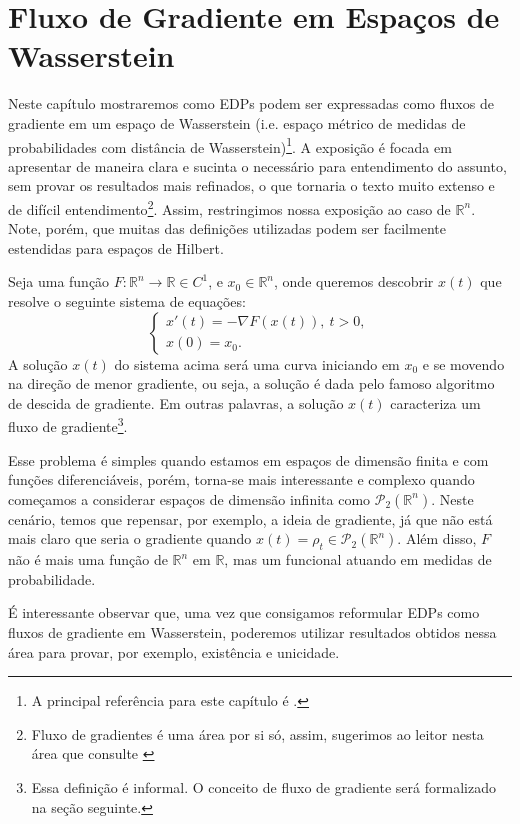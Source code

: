 \newpage
\chapter{Fluxo de Gradiente em Espaços de Wasserstein}

Neste capítulo mostraremos como EDPs podem ser expressadas como
fluxos de gradiente em um espaço de Wasserstein
(i.e. espaço métrico de medidas de probabilidades com distância
de Wasserstein)\footnote{A principal referência para este capítulo
é \citet{santambrogio2017euclidean}.}. A exposição é
focada em apresentar de maneira clara e sucinta o necessário para entendimento
do assunto, sem provar os resultados mais refinados, o que tornaria o
texto muito extenso e de difícil
entendimento\footnote{Fluxo de gradientes é uma área por si só, assim, sugerimos ao leitor nesta área
que consulte \citet{ambrosio2008gradient}}. Assim, restringimos
nossa exposição ao caso de $\mathbb R^n$. Note, porém, que muitas das definições
utilizadas podem ser facilmente estendidas para espaços de Hilbert.

Seja uma função $F:\mathbb R^n \to \mathbb R \in C^1$, e $x_0 \in \mathbb R^n$,
onde queremos descobrir $x(t)$ que resolve o seguinte sistema de equações:
\begin{equation}
    \begin{cases}
        x'(t) = -\nabla F(x(t)), \ t>0,\\
        x(0)  = x_0.
    \end{cases}
\end{equation}
A solução $x(t)$ do sistema acima será uma curva iniciando em $x_0$ e se movendo
na direção de menor gradiente, ou seja, a solução é dada
pelo famoso algoritmo de descida de gradiente. Em outras palavras,
a solução $x(t)$ caracteriza um fluxo de gradiente\footnote{Essa definição é informal. O conceito
de fluxo de gradiente será formalizado na seção seguinte.}.

Esse problema é simples quando estamos em espaços de dimensão finita e com
funções diferenciáveis, porém, torna-se mais
interessante e complexo quando começamos a considerar espaços de dimensão infinita
como $\mathcal P_2(\mathbb R^n)$. Neste cenário, temos que repensar, por exemplo,
a ideia de gradiente, já que não está mais claro que seria o gradiente quando
$x(t) = \rho_t \in \mathcal P_2(\mathbb R^n)$. Além disso, $F$ não é mais uma
função de $\mathbb R^n$ em $\mathbb R$, mas um funcional atuando em medidas
de probabilidade.

É interessante observar que, uma vez que consigamos reformular EDPs
como fluxos de gradiente em Wasserstein, poderemos utilizar resultados
obtidos nessa área para provar, por exemplo, existência e unicidade.

